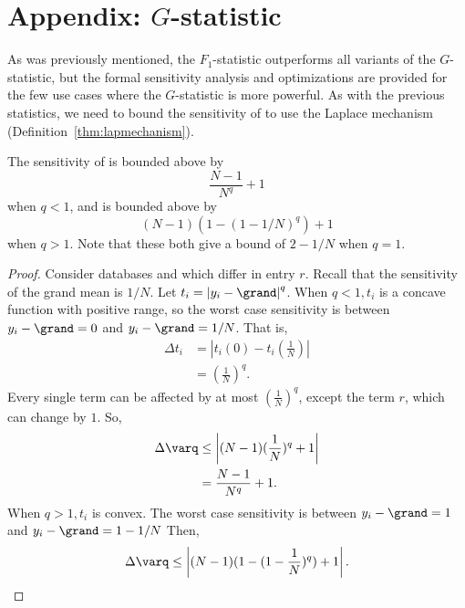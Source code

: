 
\section{Appendix: $G$-statistic}\label{sec:Gapp}
As was previously mentioned, the $F_1$-statistic outperforms all variants of the $G$-statistic, but the formal sensitivity analysis and optimizations are provided for the few use cases where the $G$-statistic is more powerful. 
  As with the previous statistics, we need to bound the sensitivity of \varq to use the Laplace mechanism (Definition~\ref{thm:lapmechanism}).

\begin{theorem} \label{thm:varqSens} 
The sensitivity of \varq is bounded above by
$$ \frac{N-1}{N^q} + 1 $$
when $q<1$, and is bounded above by
$$ (N-1)(1-(1-1/N)^q) + 1 $$
when $q>1$. Note that these both give a bound of $2-1/N$ when $q=1$.
\end{theorem}

\begin{proof}
Consider databases \x and \xprime which differ in entry $r$. Recall that the sensitivity of the grand mean is $1/N$. Let $t_i = \left\vert  y_i - \grand \right\vert ^q$. When $q<1, t_i$ is a concave function with positive range, so the worst case sensitivity is between $ y_i - \grand = 0$ and $ y_i - \grand = 1/N$. That is, 
\begin{align*}
\Delta t_i &= \left\vert t_{i}(0) - t_i\left(\frac{1}{N}\right) \right\vert \\
	&= \left( \frac{1}{N} \right)^q.
\end{align*}
%
Every single term can be affected by at most $\left( \frac{1}{N} \right)^q$, except the term $r$, which can change by $1$. So, 
\begin{align*}
\Delta \varq &\le \left\vert (N-1)(\frac{1}{N})^q + 1 \right\vert \\
	&= \frac{N-1}{N^q} + 1.
\end{align*}
%
When $q>1, t_i$ is convex. The worst case sensitivity is between  $y_i - \grand = 1$ and $y_i - \grand = 1-1/N$ Then,
\begin{align*}
\Delta \varq \le \left\vert (N-1)(1-(1-\frac{1}{N})^q) + 1 \right\vert.
\end{align*}
\end{proof}


